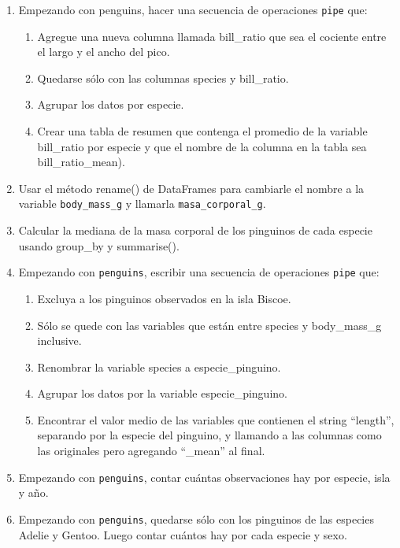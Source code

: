 \documentclass[a4paper,11pt]{article}
\theoremstyle{definition}
\begin{document}
\begin{enumerate}
\item Empezando con penguins, hacer una secuencia de operaciones \lstinline{pipe} que:
\begin{enumerate}
\item Agregue una nueva columna llamada bill_ratio que sea el cociente entre el largo y el ancho del pico.
\item Quedarse sólo con las columnas species y bill_ratio.
\item Agrupar los datos por especie.
\item Crear una tabla de resumen que contenga el promedio de la variable bill_ratio por especie y que el nombre de la columna en la tabla sea bill_ratio_mean).
\end{enumerate}

\item Usar el método rename() de DataFrames para cambiarle el nombre a la variable \lstinline{body_mass_g} y llamarla \lstinline{masa_corporal_g}.

\item Calcular la mediana de la masa corporal de los pinguinos de cada especie usando group_by y summarise().

\item Empezando con \lstinline{penguins}, escribir una secuencia de operaciones \lstinline{pipe} que:
\begin{enumerate}
\item Excluya a los pinguinos observados en la isla Biscoe.
\item Sólo se quede con las variables que están entre species y body_mass_g inclusive.
\item Renombrar la variable species a especie_pinguino.
\item Agrupar los datos por la variable especie_pinguino.
\item Encontrar el valor medio de las variables que contienen el string “length”, separando por la especie del pinguino, y llamando a las columnas como las originales pero agregando “_mean” al final.
\end{enumerate}

\item Empezando con \lstinline{penguins}, contar cuántas observaciones hay por especie, isla y año.

\item Empezando con \lstinline{penguins}, quedarse sólo con los pinguinos de las especies Adelie y Gentoo. Luego contar cuántos hay por cada especie y sexo.


\end{enumerate}
\end{document}
